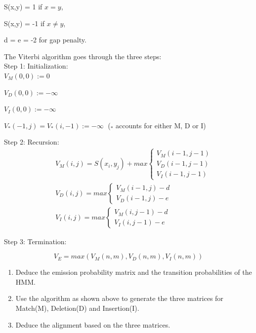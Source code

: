 \documentclass[a4paper,11pt]{article}
\begin{document}
S(x,y) = 1 if $x=y$, 

S(x,y) = -1 if $x\neq y$,

d = e = -2 for gap penalty.

\newpage
The Viterbi algorithm goes through the three steps:\\


Step 1: Initialization:\\

$V_M(0,0):=0$

$V_D(0,0):=-\infty$

$V_I(0,0):=-\infty$

$V_*(-1,j)=V_*(i,-1):=-\infty \;$ ($_*$ accounts for either M, D or I)
\vspace{0.5cm}

Step 2: Recursion:
\begin{eqnarray}
&&
V_M(i,j) =S(x_{i},y_{j})+max 
	\left\{ \begin{array}{l}
	 V_M(i-1,j-1) \\
     V_D(i-1,j-1) \\
     V_I(i-1,j-1)
    \end{array} \right.\nonumber\\
&&
V_D(i,j) =max \left\{ 
    \begin{array}{ll}
     V_M(i-1,j)-d \\
     V_D(i-1,j)-e 
    \end{array} \right.\nonumber\\
&&
V_I(i,j) =max \left\{ 
    \begin{array}{ll}
     V_M(i,j-1)-d\\
     V_I(i,j-1)-e
    \end{array} \right.\nonumber
\end{eqnarray}


Step 3: Termination:

$$V_E=max(V_M(n,m),V_D(n,m),V_I(n,m))$$


\begin{enumerate}
\item Deduce the emission probability matrix and the transition probabilities of the HMM.
\item Use the algorithm as shown above to generate the three matrices for Match(M), Deletion(D) and Insertion(I).
\item Deduce the alignment based on the three matrices.
\end{enumerate}

\newpage
\end{document}
